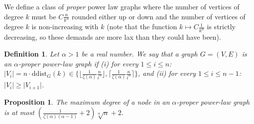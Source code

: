 \documentclass{article}
\newtheorem{definition}{Definition}
\newtheorem{proposition}{Proposition}
\theoremstyle{remark}
\begin{document}
 We define a class of \emph{proper} power law graphs where the number of vertices of degree $k$
 must be $C \frac{n}{k^{\alpha}}$ rounded either up or down and the number of vertices of degree $k$ is non-increasing
 with $k$ (note that the function $k \mapsto  C \frac{1}{k^{\alpha}}$ is strictly decreasing, so these demands
 are more lax than they could have been).
  

\begin{definition}
Let $\alpha > 1$ be a real number. We say that a graph  $G=(V,E)$ is an  $\alpha$-\emph{proper power-law graph} if (i) for every $1 \leq i \leq n$:  $\vert V_i \vert = n \cdot \mathrm{ddist}_G(k)\in \{\lfloor \frac{1}{\zeta(\alpha)}\frac{n}{i^{\alpha}} \rfloor, \lceil \frac{1}{\zeta(\alpha)} \frac{n}{i^{\alpha}} \rceil\}$, and (ii) for every $1 \leq i \leq n-1$: $\vert V_i \vert \geq \vert V_{i+1} \vert$. 
\end{definition}

\begin{proposition}\label{prop:maxnodeproper}
The maximum degree of a node in an $\alpha$-proper power-law graph is at most $\left(\frac{1}{\zeta(\alpha) (\alpha - 1)} + 2\right) \sqrt[\alpha]{n} + 2$.
\end{proposition}
\end{document}
